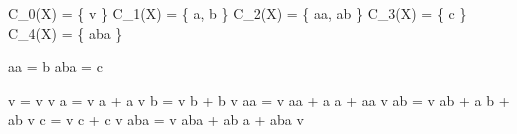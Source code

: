 
C_{0}(X) = \{ v \}
C_{1}(X) = \{ a, b \}
C_{2}(X) = \{ aa, ab \}
C_{3}(X) = \{ c \}
C_{4}(X) = \{ aba \}

\partial aa = b
\partial aba = c

\Delta v = v \otimes v
\Delta a = v \otimes a + a \otimes v
\Delta b = v \otimes b + b \otimes v
\Delta aa = v \otimes aa + a \otimes a + aa \otimes v
\Delta ab = v \otimes ab + a \otimes b + ab \otimes v
\Delta c = v \otimes c + c \otimes v
\Delta aba = v \otimes aba + ab \otimes a + aba \otimes v